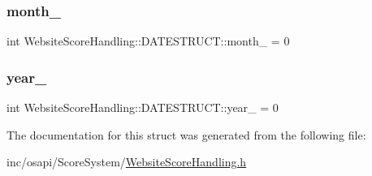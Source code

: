 \subsubsection{\texorpdfstring{month\+\_\+}{month\_}}
{\footnotesize\ttfamily int Website\+Score\+Handling\+::\+D\+A\+T\+E\+S\+T\+R\+U\+C\+T\+::month\+\_\+ = 0}

\mbox{\label{struct_website_score_handling_1_1_d_a_t_e_s_t_r_u_c_t_afdf643d689824a73cc4ce139c850a3f3}} 
\subsubsection{\texorpdfstring{year\+\_\+}{year\_}}
{\footnotesize\ttfamily int Website\+Score\+Handling\+::\+D\+A\+T\+E\+S\+T\+R\+U\+C\+T\+::year\+\_\+ = 0}



The documentation for this struct was generated from the following file\+:\begin{DoxyCompactItemize}
\item 
inc/osapi/\+Score\+System/\hyperlink{_website_score_handling_8h}{Website\+Score\+Handling.\+h}\end{DoxyCompactItemize}
